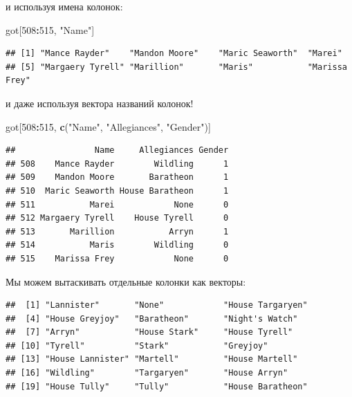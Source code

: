 \documentclass[]{book}
\newenvironment{Shaded}{\begin{snugshade}}{\end{snugshade}}
\newcommand{\CommentTok}[1]{\textcolor[rgb]{0.56,0.35,0.01}{\textit{#1}}}
\newcommand{\DecValTok}[1]{\textcolor[rgb]{0.00,0.00,0.81}{#1}}
\newcommand{\KeywordTok}[1]{\textcolor[rgb]{0.13,0.29,0.53}{\textbf{#1}}}
\newcommand{\NormalTok}[1]{#1}
\newcommand{\OperatorTok}[1]{\textcolor[rgb]{0.81,0.36,0.00}{\textbf{#1}}}
\newcommand{\StringTok}[1]{\textcolor[rgb]{0.31,0.60,0.02}{#1}}
\begin{document}
и используя имена колонок:

\begin{Shaded}
\begin{Highlighting}[]
\NormalTok{got[}\DecValTok{508}\OperatorTok{:}\DecValTok{515}\NormalTok{, }\StringTok{"Name"}\NormalTok{]}
\end{Highlighting}
\end{Shaded}

\begin{verbatim}
## [1] "Mance Rayder"    "Mandon Moore"    "Maric Seaworth"  "Marei"          
## [5] "Margaery Tyrell" "Marillion"       "Maris"           "Marissa Frey"
\end{verbatim}

и даже используя вектора названий колонок!

\begin{Shaded}
\begin{Highlighting}[]
\NormalTok{got[}\DecValTok{508}\OperatorTok{:}\DecValTok{515}\NormalTok{, }\KeywordTok{c}\NormalTok{(}\StringTok{"Name"}\NormalTok{, }\StringTok{"Allegiances"}\NormalTok{, }\StringTok{"Gender"}\NormalTok{)]}
\end{Highlighting}
\end{Shaded}

\begin{verbatim}
##                Name     Allegiances Gender
## 508    Mance Rayder        Wildling      1
## 509    Mandon Moore       Baratheon      1
## 510  Maric Seaworth House Baratheon      1
## 511           Marei            None      0
## 512 Margaery Tyrell    House Tyrell      0
## 513       Marillion           Arryn      1
## 514           Maris        Wildling      0
## 515    Marissa Frey            None      0
\end{verbatim}

Мы можем вытаскивать отдельные колонки как векторы:

\begin{Shaded}
\end{Shaded}

\begin{verbatim}
##  [1] "Lannister"       "None"            "House Targaryen"
##  [4] "House Greyjoy"   "Baratheon"       "Night's Watch"  
##  [7] "Arryn"           "House Stark"     "House Tyrell"   
## [10] "Tyrell"          "Stark"           "Greyjoy"        
## [13] "House Lannister" "Martell"         "House Martell"  
## [16] "Wildling"        "Targaryen"       "House Arryn"    
## [19] "House Tully"     "Tully"           "House Baratheon"
\end{verbatim}
\end{document}
